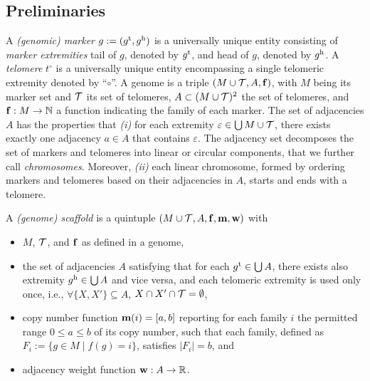 \documentclass[runningheads]{llncs}
\begin{document}
\subsection{Preliminaries}
A \emph{(genomic) marker} $g := (g^{\textnormal{t}}, g^{\textnormal{h}})$ is a universally unique entity consisting of \emph{marker extremities} tail of $g$, denoted by $g^{\textnormal{t}}$, and head of $g$, denoted by $g^{\textnormal{h}}$. 
A \emph{telomere} $t^\circ$ is a universally unique entity encompassing a single telomeric extremity denoted by ``$\circ$''. 
A genome is a triple $(M \cup \mathcal{T}, A, \mathbf{f})$, with $M$ being its marker set and $\mathcal{T}$ its set of telomeres, $A \subset (M \cup \mathcal{T})^2$ the set of telomeres, and $\mathbf{f}: M \to \mathbb N$ a function indicating the family of each marker. 
The set of adjacencies $A$ has the properties that \emph{(i)} for each extremity $\varepsilon \in \bigcup M \cup \mathcal{T}$, there exists exactly one adjacency $a \in A$ that contains $\varepsilon$. 
The adjacency set decomposes the set of markers and telomeres into linear or circular components, that we further call \emph{chromosomes}. 
Moreover, \emph{(ii)} each linear chromosome, formed by ordering markers and telomeres based on their adjacencies in $A$, starts and ends with a telomere. 

A \emph{(genome) scaffold} is a quintuple $(M \cup \mathcal{T}, A, \mathbf{f}, \mathbf{m}, \mathbf{w})$ with 
\begin{itemize}
    \item $M$, $\mathcal{T}$, and $\mathbf{f}$ as defined in a genome, 
    \item the set of adjacencies $A$ satisfying that for each $g^{\textnormal{t}} \in \bigcup A$, there exists also extremity $g^{\textnormal{h}} \in \bigcup A$ and vice versa, and each telomeric extremity is used only once, i.e., $\forall \{X, X'\} \subseteq A$, $X \cap X' \cap \mathcal{T} = \emptyset$,
    \item copy number function $\mathbf{m}(i) = [a, b]$ reporting for each family $i$ the permitted range $0 \leq a \leq b$ of its copy number, such that each family, defined as $F_i := \{g \in M \mid f(g) = i\}$, satisfies $|F_i| = b$, and
    \item adjacency weight function $\mathbf{w}: A \to \mathbb R$. %
\end{itemize}
\end{document}
